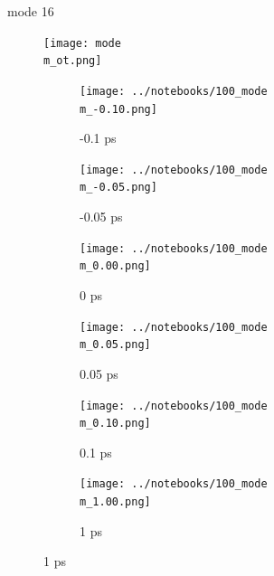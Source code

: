 \documentclass{beamer}
\newcommand\w{0.32}
\begin{document}
\renewcommand\m{16}
\begin{frame}{mode \m}
			\vspace{\vh mm}
	\begin{figure}
		\centering
		\texttt{[image: mode\\m\_ot.png]}
	\end{figure}
	\begin{figure}
		\centering
		\begin{subfigure}[b]{\w\textwidth}
			\centering
			\texttt{[image: ../notebooks/100\_mode\\m\_-0.10.png]}
			\caption{-0.1 ps}
		\end{subfigure}
		\begin{subfigure}[b]{\w\textwidth}
			\centering
			\texttt{[image: ../notebooks/100\_mode\\m\_-0.05.png]}
			\caption{-0.05 ps}
		\end{subfigure}
		\begin{subfigure}[b]{\w\textwidth}
			\centering
			\texttt{[image: ../notebooks/100\_mode\\m\_0.00.png]}
			\caption{0 ps}
		\end{subfigure}
		\begin{subfigure}[b]{\w\textwidth}
			\centering
			\texttt{[image: ../notebooks/100\_mode\\m\_0.05.png]}
			\caption{0.05 ps}
		\end{subfigure}
		\begin{subfigure}[b]{\w\textwidth}
			\centering
			\texttt{[image: ../notebooks/100\_mode\\m\_0.10.png]}
			\caption{0.1 ps}
		\end{subfigure}
		\begin{subfigure}[b]{\w\textwidth}
			\centering
			\texttt{[image: ../notebooks/100\_mode\\m\_1.00.png]}
			\caption{1 ps}
		\end{subfigure}
	\end{figure}
\end{frame}
\end{document}

